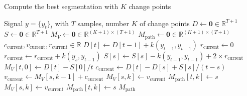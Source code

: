 \documentclass[12pt]{article}
\newcommand\RR{\mathbb{R}}
\begin{document}
\begin{algorithm}
    \small
    \caption{Compute the best segmentation with $K$ change points} %
    \label{alg:dynp} %
    \begin{algorithmic} %
        \REQUIRE Signal $y = \{y_t\}_t$ with $T$ samples, number $K$ of change points
        \STATE {}
        \STATE $D \gets \bm{0}\in\mathbb{R}^{T+1}$ 
        \STATE $S \gets \bm{0}\in\mathbb{R}^{T+1}$ 
        \STATE $M_V \gets \bm{0}\in\mathbb{R}^{(K+1)\times (T+1)}$ 
        \STATE $M_{\text{path}} \gets \bm{0}\in\mathbb{R}^{(K+1)\times (T+1)}$ 
        \STATE $c_{\text{current}}, v_{\text{current}}, r_{\text{current}}\in\RR$ 
        \STATE
        \STATE {}
        \STATE
        \STATE {}
        \STATE $D[t] \gets D[t-1] + k(y_{t-1}, y_{t-1})$ 
        \STATE
        \STATE {}
        \STATE $r_{\text{current}}\gets0$
        \STATE $r_{\text{current}} \gets r_{\text{current}} + k(y_{s}, y_{t-1})$ 
        \STATE $S[s] \gets S[s] - k(y_{t-1}, y_{t-1}) + 2\times r_{\text{current}}$ 
        \ENDFOR
        \STATE
        \STATE {}
        \STATE $M_{V}[t, 0] \gets D[t] - S[0]/t$ 
        \STATE $c_{\text{current}} \gets D[t]-D[s] + S[s]/(t-s)$ 
        \STATE $v_{\text{current}} \gets M_V[s, k-1] + c_{\text{current}}$ 
        \STATE $M_V[s, k] \gets v_{\text{current}}$
        \STATE $M_{\text{path}}[t, k] \gets s$
        \ELSE
        \STATE $M_V[s, k] \gets v_{\text{current}}$
        \STATE $M_{\text{path}}[t, k] \gets s$
        \ENDIF
        \ENDIF
        \ENDFOR
        \ENDFOR
        \ENDFOR
        \RETURN $M_{\text{path}}$
    \end{algorithmic}
\end{algorithm}



\end{document}
